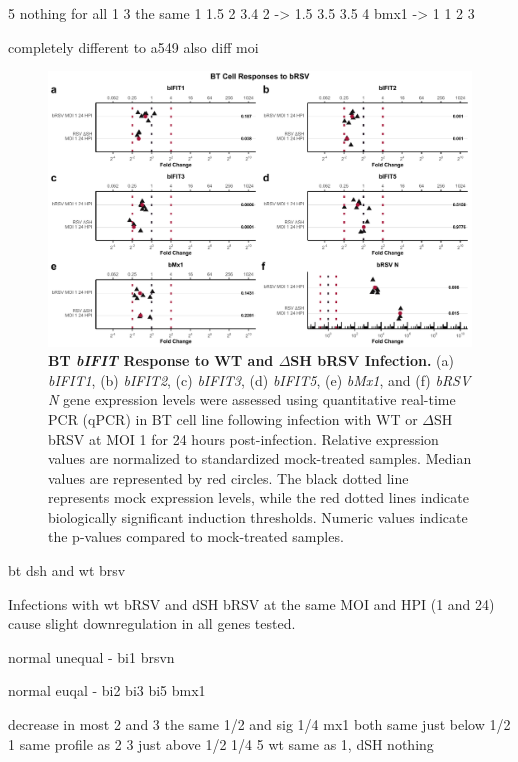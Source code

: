 5 nothing for all
1 3 the same    1 1.5 2 3.4
2 -> 1.5 3.5 3.5 4
bmx1 -> 1 1 2 3

completely different to a549
    also diff moi

    \begin{figure}
        \centering
        \includegraphics[width=1\linewidth]{07. Chapter 2/Figs/02. Induction/09. bt_brsv.pdf}
        \caption[BT \textit{bIFIT} Response to WT and \(\Delta\)SH bRSV Infection.]{\textbf{BT \textit{bIFIT} Response to WT and \(\Delta\)SH bRSV Infection.} (a) \textit{bIFIT1}, (b) \textit{bIFIT2}, (c) \textit{bIFIT3}, (d) \textit{bIFIT5}, (e) \textit{bMx1}, and (f) \textit{bRSV N} gene expression levels were assessed using quantitative real-time PCR (qPCR) in BT cell line following infection with WT or \(\Delta\)SH bRSV at MOI 1 for 24 hours post-infection. Relative expression values are normalized to standardized mock-treated samples. Median values are represented by red circles. The black dotted line represents mock expression levels, while the red dotted lines indicate biologically significant induction thresholds. Numeric values indicate the p-values compared to mock-treated samples.}
        \label{fig:BT responses to bRSV}
    \end{figure}
    
    bt dsh and wt brsv
    
    Infections with wt bRSV and dSH bRSV at the same MOI and HPI (1 and 24) cause slight downregulation in all genes tested.
    
    normal unequal - bi1 brsvn
    
    normal euqal - bi2 bi3 bi5 bmx1
    
    decrease in most
    2 and 3 the same
    1/2 and sig 1/4
    mx1 both same just below 1/2
    1 same profile as 2 3 
        just above 1/2 1/4
    5 wt same as 1, dSH nothing    

